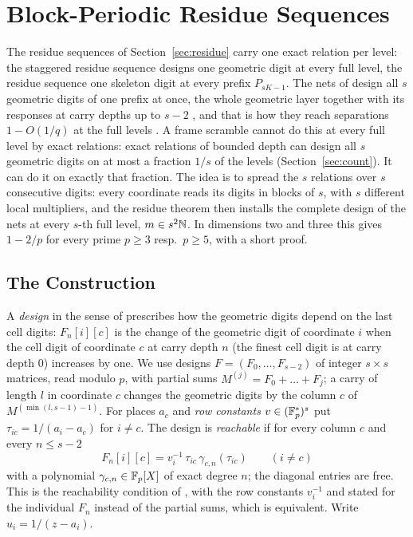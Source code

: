 %
%
%
%
%
\section{Block-Periodic Residue Sequences}\label{sec:block}
The residue sequences of Section~\ref{sec:residue} carry one exact relation per level: the staggered residue sequence designs one geometric digit at every full level, the residue sequence one skeleton digit at every prefix $P_{sK-1}$. The nets of \cite{Gru26geo} design all $s$ geometric digits of one prefix at once, the whole geometric layer together with its responses at carry depths up to $s-2$%
, and that is how they reach separations $1-O(1/q)$ at the full levels%
. A frame scramble cannot do this at every full level by exact relations: exact relations of bounded depth can design all $s$ geometric digits on at most a fraction $1/s$ of the levels (Section~\ref{sec:count}). It can do it on exactly that fraction. The idea is to spread the $s$ relations over $s$ consecutive digits: every coordinate reads its digits in blocks of $s$, with $s$ different local multipliers, and the residue theorem then installs the complete design of the nets at every $s$-th full level, $m\in s^2\mathbb{N}$. In dimensions two and three this gives $1-2/p$ for every prime $p\ge3$ resp.\ $p\ge5$, with a short proof.

\subsection{The Construction}\label{sec:blockdef}
A \emph{design} in the sense of \cite{Gru26geo} prescribes how the geometric digits depend on the last cell digits: $F_n[i][c]$ is the change of the geometric digit of coordinate $i$ when the cell digit of coordinate $c$ at carry depth $n$ (the finest cell digit is at carry depth $0$) increases by one. We use designs $F=(F_0,\dots,F_{s-2})$ of integer $s\times s$ matrices, read modulo $p$, with partial sums $M^{(j)}=F_0+\dots+F_j$; a carry of length $l$ in coordinate $c$ changes the geometric digits by the column $c$ of $M^{(\min(l,s-1)-1)}$. For places $a_c$ and \emph{row constants} $v\in(\mathbb{F}_p^*)^s$ put $\tau_{ic}=1/(a_i-a_c)$ for $i\ne c$. The design is \emph{reachable} if for every column $c$ and every $n\le s-2$
\[
F_n[i][c]=v_i^{-1}\,\tau_{ic}\,\gamma_{c,n}(\tau_{ic})\qquad(i\ne c)
\]
with a polynomial $\gamma_{c,n}\in\mathbb{F}_p[X]$ of exact degree $n$; the diagonal entries are free. This is the reachability condition of \cite{Gru26geo}%
, with the row constants $v_i^{-1}$ and stated for the individual $F_n$ instead of the partial sums, which is equivalent. Write $u_i=1/(z-a_i)$.

